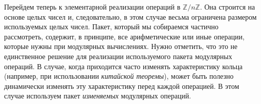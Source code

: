 
    Перейдем теперь к элементарной реализации операций в $\mathbb{Z}/n\mathbb{Z}$. Она строится на основе целых чисел
    и, следовательно, в этом случае весьма ограничена размером используемых целых чисел. Пакет, который мы собираемся частично рассмотреть, содержит, в
    принципе, все арифметические или иные операции, которые нужны при модулярных вычислениях.
    Нужно отметить, что это не единственное решение для реализации используемого пакета модулярных операций. В случае, когда приходится
    часто изменять характеристику кольца (например, при использовании \textit {китайской теоремы}), может быть полезно динамически изменять эту
    характеристику перед каждой операцией. В этом случае используем пакет \textit {изменяемых} модулярных операций.

